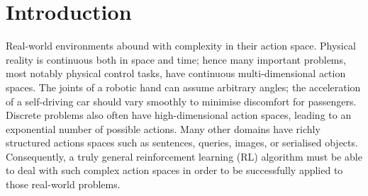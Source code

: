 \documentclass{article}
\newcommand{\muzero}{\emph{MuZero}}
\newcommand{\smuzero}{\emph{Sampled MuZero}}
\newcommand{\dmcs}{DeepMind Control Suite }
\newcommand{\rwrl}{Real-World RL }
\begin{document}





\printAffiliationsAndNotice{\icmlEqualContribution} 

\begin{abstract}
Many important real-world problems have action spaces that are high-dimensional, continuous or both, making full enumeration of all possible actions infeasible. Instead, only small subsets of actions can be sampled for the purpose of policy evaluation and improvement. In this paper, we propose a general framework to reason in a principled way about policy evaluation and improvement over such sampled action subsets. This sample-based policy iteration framework can in principle be applied to any reinforcement learning algorithm based upon policy iteration. Concretely, we propose \smuzero{}, an extension of the \muzero{} algorithm that is able to learn in domains with arbitrarily complex action spaces by planning over sampled actions. We demonstrate this approach on the classical board game of Go and on two continuous control benchmark domains: \dmcs and \rwrl Suite.

\end{abstract}

\section{Introduction}

Real-world environments abound with complexity in their action space. Physical reality is continuous both in space and time; hence many important problems, most notably physical control tasks, have continuous multi-dimensional action spaces. The joints of a robotic hand can assume arbitrary angles; the acceleration of a self-driving car should vary smoothly to minimise discomfort for passengers. Discrete problems also often have high-dimensional action spaces, leading to an exponential number of possible actions. Many other domains have richly structured actions spaces such as sentences, queries, images, or serialised objects. Consequently, a truly general reinforcement learning (RL) algorithm must be able to deal with such complex action spaces in order to be successfully applied to those real-world problems.
\end{document}
